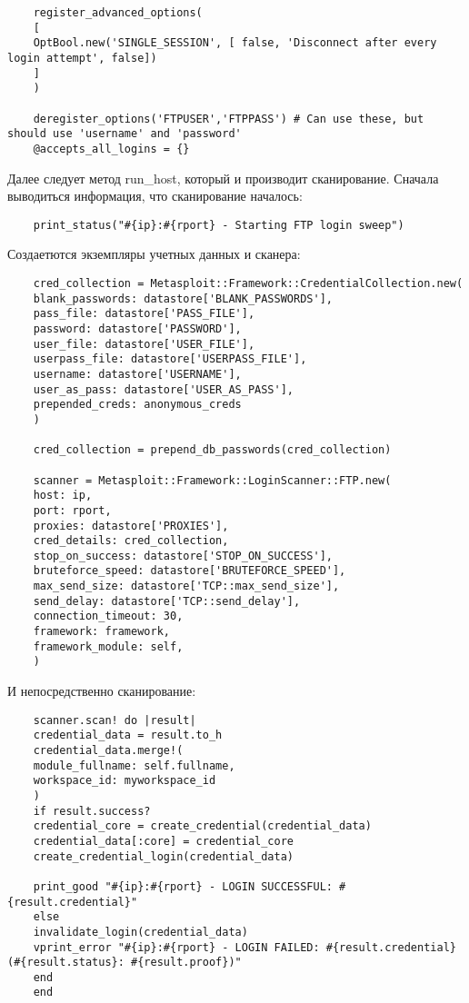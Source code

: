 \documentclass{article}
\begin{document}
\begin{itemize}
\begin{verbatim}
 	register_advanced_options(
 	[
 	OptBool.new('SINGLE_SESSION', [ false, 'Disconnect after every login attempt', false])
 	]
 	)
 	
 	deregister_options('FTPUSER','FTPPASS') # Can use these, but should use 'username' and 'password'
 	@accepts_all_logins = {}
 	\end{verbatim}
 	
 	Далее следует метод run\_host, который и производит сканирование. Сначала выводиться информация, что сканирование началось:
 	
 	\begin{verbatim}
 	print_status("#{ip}:#{rport} - Starting FTP login sweep")
 	\end{verbatim}
 	
 	Создаетются экземпляры учетных данных и сканера:
 	
 	\begin{verbatim}
 	cred_collection = Metasploit::Framework::CredentialCollection.new(
 	blank_passwords: datastore['BLANK_PASSWORDS'],
 	pass_file: datastore['PASS_FILE'],
 	password: datastore['PASSWORD'],
 	user_file: datastore['USER_FILE'],
 	userpass_file: datastore['USERPASS_FILE'],
 	username: datastore['USERNAME'],
 	user_as_pass: datastore['USER_AS_PASS'],
 	prepended_creds: anonymous_creds
 	)
 	
 	cred_collection = prepend_db_passwords(cred_collection)
 	
 	scanner = Metasploit::Framework::LoginScanner::FTP.new(
 	host: ip,
 	port: rport,
 	proxies: datastore['PROXIES'],
 	cred_details: cred_collection,
 	stop_on_success: datastore['STOP_ON_SUCCESS'],
 	bruteforce_speed: datastore['BRUTEFORCE_SPEED'],
 	max_send_size: datastore['TCP::max_send_size'],
 	send_delay: datastore['TCP::send_delay'],
 	connection_timeout: 30,
 	framework: framework,
 	framework_module: self,
 	)
 	\end{verbatim}
 	
 	И непосредственно сканирование:
 	
 	\begin{verbatim}
 	scanner.scan! do |result|
 	credential_data = result.to_h
 	credential_data.merge!(
 	module_fullname: self.fullname,
 	workspace_id: myworkspace_id
 	)
 	if result.success?
 	credential_core = create_credential(credential_data)
 	credential_data[:core] = credential_core
 	create_credential_login(credential_data)
 	
 	print_good "#{ip}:#{rport} - LOGIN SUCCESSFUL: #{result.credential}"
 	else
 	invalidate_login(credential_data)
 	vprint_error "#{ip}:#{rport} - LOGIN FAILED: #{result.credential} (#{result.status}: #{result.proof})"
 	end
 	end
 	\end{verbatim}
 	

\end{itemize}
\end{document}
